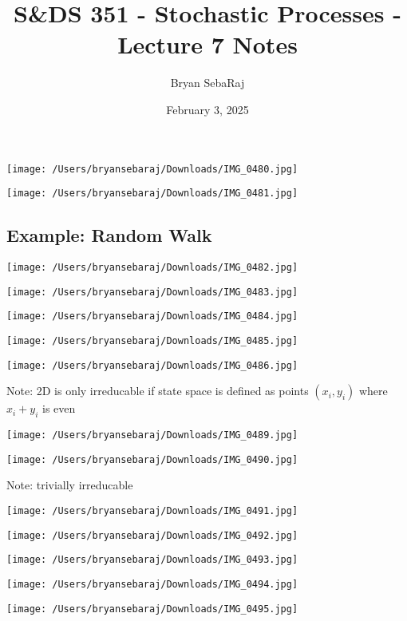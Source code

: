 \documentclass{article}
\title{S\&DS 351 - Stochastic Processes - Lecture 7 Notes}
\author{Bryan SebaRaj}
\date{February 3, 2025}
\begin{document}
\maketitle


\texttt{[image: /Users/bryansebaraj/Downloads/IMG\_0480.jpg]}

\texttt{[image: /Users/bryansebaraj/Downloads/IMG\_0481.jpg]}

\subsection*{Example: Random Walk}

\texttt{[image: /Users/bryansebaraj/Downloads/IMG\_0482.jpg]}


\texttt{[image: /Users/bryansebaraj/Downloads/IMG\_0483.jpg]}


\texttt{[image: /Users/bryansebaraj/Downloads/IMG\_0484.jpg]}

\texttt{[image: /Users/bryansebaraj/Downloads/IMG\_0485.jpg]}


\texttt{[image: /Users/bryansebaraj/Downloads/IMG\_0486.jpg]}

Note: 2D is only irreducable if state space is defined as points $(x_i, y_i)$ where $x_i + y_i$ is even


\texttt{[image: /Users/bryansebaraj/Downloads/IMG\_0489.jpg]}


\texttt{[image: /Users/bryansebaraj/Downloads/IMG\_0490.jpg]}

Note: trivially irreducable

\texttt{[image: /Users/bryansebaraj/Downloads/IMG\_0491.jpg]}

\texttt{[image: /Users/bryansebaraj/Downloads/IMG\_0492.jpg]}


\texttt{[image: /Users/bryansebaraj/Downloads/IMG\_0493.jpg]}


\texttt{[image: /Users/bryansebaraj/Downloads/IMG\_0494.jpg]}

\texttt{[image: /Users/bryansebaraj/Downloads/IMG\_0495.jpg]}


\end{document}
